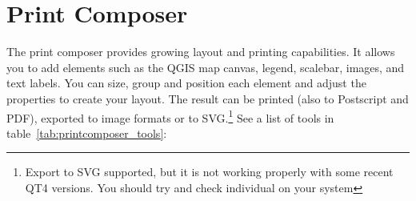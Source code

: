 
\section{Print Composer}\label{label_printcomposer}

\updatedisclaimer

The print composer provides growing layout and printing
capabilities. It allows you to add elements such as the QGIS map canvas, 
legend, scalebar, images, and text labels. You can size, group 
and position each element and adjust the properties to create your layout. 
The result can be printed (also to Postscript and PDF), exported to image formats or to SVG.\footnote{Export to SVG supported, but it is not working 
properly with some recent QT4 versions. You should try and check individual 
on your system} See a list of tools in table~\ref{tab:printcomposer_tools}:

